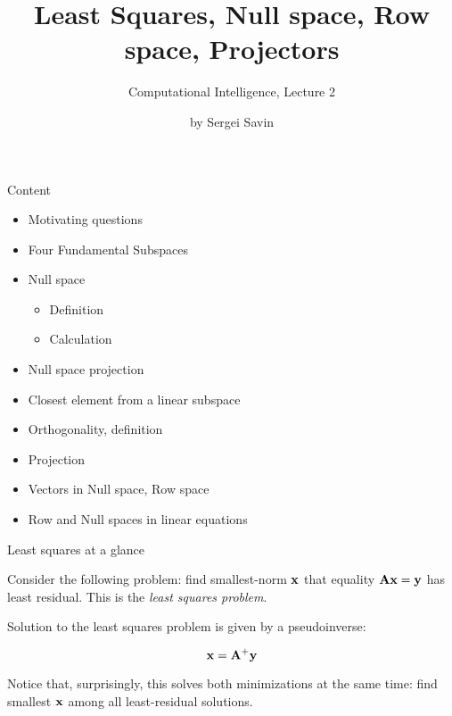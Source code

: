\documentclass{beamer}
\title{Least Squares, Null space, Row space, Projectors}
\subtitle{Computational Intelligence, Lecture 2}
\author{by Sergei Savin}
\date{\mydate}
\begin{document}
\maketitle


\begin{frame}{Content}

\begin{itemize}
\item Motivating questions
\item Four Fundamental Subspaces
\item Null space
\begin{itemize}
    \item Definition
    \item Calculation
\end{itemize}
\item Null space projection
\item Closest element from a linear subspace
\item Orthogonality, definition
\item Projection
\item Vectors in Null space, Row space
\item Row and Null spaces in linear equations
\end{itemize}

\end{frame}




\begin{frame}{Least squares at a glance}
	\begin{flushleft}
		
	Consider the following problem: find smallest-norm $\mathbf{x}$ that equality $\mathbf{A}\mathbf{x} = \mathbf{y}$ has least residual. This is the \emph{least squares problem}.
	
	\bigskip
	
	Solution to the least squares problem is given by a pseudoinverse:
	
	\begin{equation}
		\mathbf{x} = \mathbf{A}^+\mathbf{y}
	\end{equation}

Notice that, surprisingly, this solves both minimizations at the same time: find smallest $\mathbf{x}$ among all least-residual solutions.
		
	\end{flushleft}
\end{frame}
\end{document}

